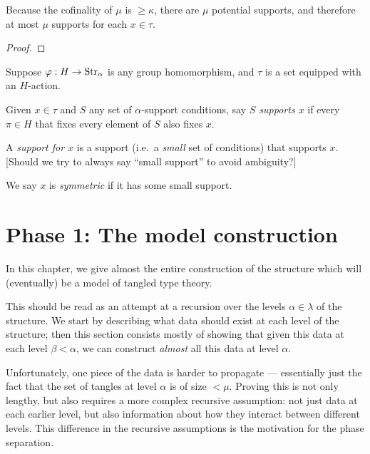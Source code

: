 \begin{lemma}
\label {lem:count-supports}
\leanok
Because the cofinality of $\mu$ is $\geq \kappa$, there are $\mu$ potential supports, and therefore at most $\mu$ supports for each $x \in \tau$.
\end{lemma}
\begin{proof}
\leanok
\end{proof}

\begin{definition}
\label{def:support-of}
  \leanok
  Suppose $\varphi : H \to \mathrm{Str}_\alpha$ is any group homomorphism, and $\tau$ is a set equipped with an $H$-action.

  Given $x \in \tau$ and $S$ any set of $\alpha$-support conditions, say \emph{$S$ supports $x$} if every $\pi \in H$ that fixes every element of $S$ also fixes $x$.

  A \emph{support for $x$} is a support (i.e.\ a \emph{small} set of conditions) that supports $x$. [Should we try to always say “small support” to avoid ambiguity?]

  We say $x$ is \emph{symmetric} if it has some small support.
\end{definition}

\chapter{Phase 1: The model construction} \label{ch:model-construction}

In this chapter, we give almost the entire construction of the structure which will (eventually) be a model of tangled type theory.

This should be read as an attempt at a recursion over the levels $\alpha \in \lambda$ of the structure.  We start by describing what data should exist at each level of the structure; then this section consists mostly of showing that given this data at each level $\beta < \alpha$, we can construct \emph{almost} all this data at level $\alpha$.

Unfortunately, one piece of the data is harder to propagate --- essentially just the fact that the set of tangles at level $\alpha$ is of size $< \mu$.  Proving this is not only lengthy, but also requires a more complex recursive assumption: not just data at each earlier level, but also information about how they interact between different levels.  This difference in the recursive assumptions is the motivation for the phase separation.

